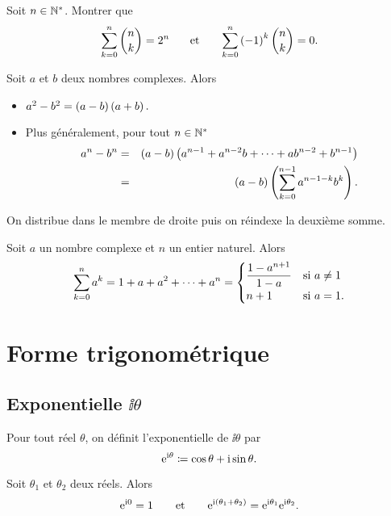 \documentclass{magnolia}
\begin{document}
\begin{exoUnique}
\exo Soit $n\in{\mathbb{N}^*}$. Montrer que
  \[\sum_{k=0}^n  \binom{n}{k}=2^n \quad\quad\!\text{et}\quad\!\quad  \sum_{k=0}^n  \left(-1\right)^k\binom{n}{k}=0.\]
\end{exoUnique}


\begin{proposition}[utile=-3]
  Soit $a$ et $b$ deux nombres complexes. Alors
  \begin{itemize}
  \item $a^2-b^2=\left(a-b\right)\left(a+b\right).$
  \item Plus généralement, pour tout $n\in{\mathbb{N}^*}$
    \begin{eqnarray*}
  a^n-b^n
  &=& \left(a-b\right)\left(a^{n-1}+a^{n-2}b+\dots+
      ab^{n-2}+b^{n-1}\right)\\
  &=& \left(a-b\right)\left(\sum_{k=0}^{n-1} a^{n-1-k}b^k\right).
  \end{eqnarray*}
  \end{itemize}
\end{proposition}

\begin{preuve}
On distribue dans le membre de droite puis on réindexe la deuxième somme.
\end{preuve}

\begin{proposition}[utile=-3]
Soit $a$ un nombre complexe et $n$ un entier naturel. Alors
\[\sum_{k=0}^n a^k=1+a+a^2+\cdots+a^n=
  \begin{cases}
  \displaystyle\frac{1-a^{n+1}}{1-a} & \text{si $a\neq 1$}\\
  n+1                  & \text{si $a=1$.}
  \end{cases}\]
\end{proposition}

\section{Forme trigonométrique}

\subsection{Exponentielle $\ii\theta$}

\begin{definition}[utile=-3]
Pour tout réel $\theta$, on définit l'exponentielle de $\ii\theta$ par
\[{\rm e}^{{\rm i}\theta}\coloneqq\cos\theta+{\rm i}\sin\theta.\]
\end{definition}

\begin{proposition}[utile=-3]
Soit $\theta_1$ et $\theta_2$ deux réels. Alors
\[{\rm e}^{{\rm i} 0}=1 \qquad\text{et}\qquad {\rm e}^{{\rm i}\left(\theta_1+\theta_2\right)}={\rm e}^{{\rm i}\theta_1}{\rm e}^{{\rm i}\theta_2}.\]
\end{proposition}
\end{document}

